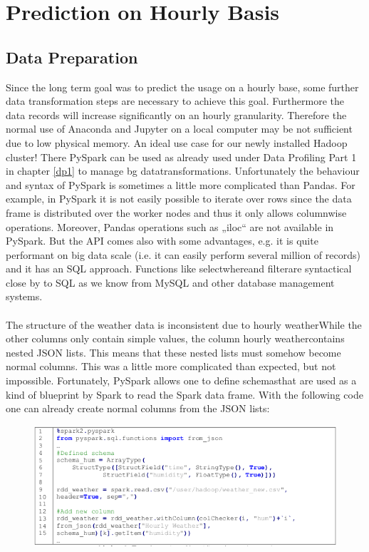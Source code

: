 
\section{Prediction on Hourly Basis}

\subsection{Data Preparation}
Since the long term goal was to predict the usage on a hourly base, some further data
transformation steps are necessary to achieve this goal. Furthermore the data records will
increase significantly on an hourly granularity. Therefore the normal use of Anaconda and Jupyter
on a local computer may be not sufficient due to low physical memory. An ideal use case for our
newly installed Hadoop cluster! There PySpark can be used as already used under Data Profiling
Part 1 in chapter \ref{dp1} to manage \glqq bg data\grqq transformations. Unfortunately the behaviour and syntax of PySpark
is sometimes a little more complicated than Pandas. For example, in PySpark it is not easily
possible to iterate over rows since the data frame is distributed over the worker nodes and thus it
only allows columnwise operations. Moreover, Pandas operations such as „iloc“ are not available
in PySpark. But the API comes also with some advantages, e.g. it is quite performant on big data
scale (i.e. it can easily perform several million of records) and it has an SQL approach.
Functions like \glqq select\grqq \glqq where\grqq and \glqq filter\grqq are syntactical close by to SQL as we know from MySQL
and other database management systems.\\\\
The structure of the weather data is inconsistent due to \glqq hourly weather\grqq  While the other columns
only contain simple values, the column \glqq hourly weather\grqq contains nested JSON lists. This means
that these nested lists must somehow become normal columns. This was a little more complicated
than expected, but not impossible. Fortunately, PySpark allows one to define \glqq schemas\grqq that are
used as a kind of blueprint by Spark to read the Spark data frame. With the following code one
can already create normal columns from the JSON lists:
\begin{figure}[H]
\hspace{-1.6cm}
\includegraphics[width=1.2\textwidth]{img/listing5}\label{fig:listing5}
\label{fig:listing5}
\end{figure}
